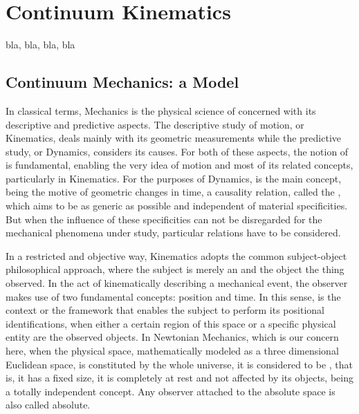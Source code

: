 \chapter{Continuum Kinematics}

bla, bla, bla, bla


\section{Continuum Mechanics: a Model}

In classical terms, Mechanics is the physical science of  concerned with its descriptive and predictive aspects. The descriptive study of motion, or Kinematics, deals mainly with its geometric measurements while the predictive study, or Dynamics, considers its causes. For both of these aspects, the notion of  is fundamental, enabling the very idea of motion and most of its related concepts, particularly in Kinematics. For the purposes of Dynamics,  is the main concept, being the motive of geometric changes in time, a causality relation, called the , which aims to be as generic as possible and independent of material specificities. But when the influence of these specificities can not be disregarded for the mechanical phenomena under study, particular  relations have to be considered. 


In a restricted and objective way, Kinematics adopts the common subject-object philosophical approach, where the subject is merely an  and the object the thing observed. In the act of kinematically describing a mechanical event, the observer makes use of two fundamental concepts: position and time. In this sense,  is the context or the framework that enables the subject to perform its positional identifications, when either a certain region of this space or a specific physical entity are the observed objects. In Newtonian Mechanics, which is our concern here, when the physical space, mathematically modeled as a three dimensional Euclidean space, is constituted by the whole universe, it is considered to be , that is, it has a fixed size, it is completely at rest and not affected by its objects, being a totally independent concept. Any observer attached to the absolute space is also called absolute. 


